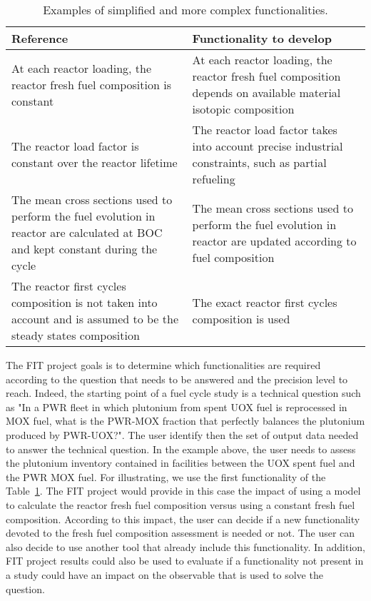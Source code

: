 \begin{table}[h]
\centering
\begin{tabular}{ |p{}|p{}| }
  \hline
  Reference & Functionality to develop \\
  \hline
  At each reactor loading, the reactor fresh fuel composition is constant & At each reactor loading, the reactor fresh fuel composition depends on available material isotopic composition \\
  \hline
  The reactor load factor is constant over the reactor lifetime & The reactor load factor takes into account precise industrial constraints, such as partial refueling \\
  \hline
  The mean cross sections used to perform the fuel evolution in reactor are calculated at BOC and kept constant during the cycle & The mean cross sections used to perform the fuel evolution in reactor are updated according to fuel composition \\
  \hline
  The reactor first cycles composition is not taken into account and is assumed to be the steady states composition & The exact reactor first cycles composition is used \\
  \hline
\end{tabular}
\label{Tab:Funct}
\caption{Examples of simplified and more complex functionalities.}
\end{table}

The FIT project goals is to determine which functionalities are required according to the question that needs to be answered and the precision level to reach. Indeed, the starting point of a fuel cycle study is a technical question such as "In a PWR fleet in which plutonium from spent UOX fuel is reprocessed in MOX fuel, what is the PWR-MOX fraction that perfectly balances the plutonium produced by PWR-UOX?". The user identify then the set of output data needed to answer the technical question. In the example above, the user needs to assess the plutonium inventory contained in facilities between the UOX spent fuel and the PWR MOX fuel. For illustrating, we use the first functionality of the Table~\ref{Tab:Funct}. The FIT project would provide in this case the impact of using a model to calculate the reactor fresh fuel composition versus using a constant fresh fuel composition. According to this impact, the user can decide if a new functionality devoted to the fresh fuel composition assessment is needed or not. The user can also decide to use another tool that already include this functionality. In addition, FIT project results could also be used to evaluate if a functionality not present in a study could have an impact on the observable that is used to solve the question.

